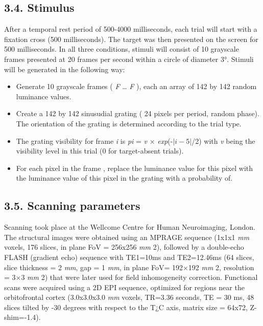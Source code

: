 \documentclass[]{article}
\providecommand{\tightlist}{%
  \setlength{\itemsep}{0pt}\setlength{\parskip}{0pt}}
\begin{document}
\hypertarget{stimulus}{%
\subsection{3.4. Stimulus}\label{stimulus}}

After a temporal rest period of 500-4000 milliseconds, each trial will
start with a fixation cross (500 milliseconds). The target was then
presented on the screen for 500 milliseconds. In all three conditions,
stimuli will consist of 10 grayscale frames presented at 20 frames per
second within a circle of diameter 3°. Stimuli will be generated in the
following way:

\begin{itemize}
\tightlist
\item
  Generate 10 grayscale frames ( \emph{F} \ldots{} \emph{F} ), each an
  array of 142 by 142 random luminance values.
\item
  Create a 142 by 142 sinusudial grating ( 24 pixels per period, random
  phase). The orientation of the grating is determined according to the
  trial type.
\item
  The grating visibility for frame \emph{i} is \emph{pi} = \emph{v} ×
  \emph{exp}(-\(|\textit{i}-5|\)/2) with \emph{v} being the visibility
  level in this trial (0 for target-absent trials).
\item
  For each pixel in the frame , replace the luminance value for this
  pixel with the luminance value of this pixel in the grating with a
  probability of.
\end{itemize}

\hypertarget{scanning-parameters}{%
\subsection{3.5. Scanning parameters}\label{scanning-parameters}}

Scanning took place at the Wellcome Centre for Human Neuroimaging,
London. The structural images were obtained using an MPRAGE sequence
(1x1x1 \emph{mm} voxels, 176 slices, in plane FoV = 256x256 \emph{mm}
2), followed by a double-echo FLASH (gradient echo) sequence with
TE1=10ms and TE2=12.46ms (64 slices, slice thickness = 2 \emph{mm}, gap
= 1 \emph{mm}, in plane FoV= 192×192 \emph{mm} 2, resolution = 3×3
\emph{mm} 2) that were later used for field inhomogeneity correction.
Functional scans were acquired using a 2D EPI sequence, optimized for
regions near the orbitofrontal cortex (3.0x3.0x3.0 \emph{mm} voxels,
TR=3.36 seconds, TE = 30 ms, 48 slices tilted by -30 degrees with
respect to the T¿C axis, matrix size = 64x72, Z-shim=-1.4).
\end{document}
